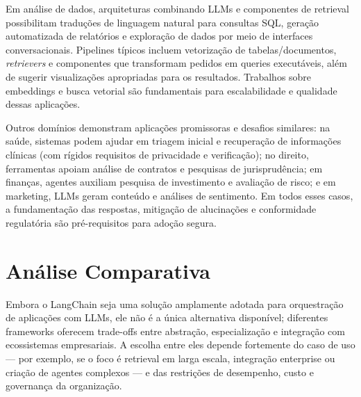 \documentclass[12pt]{article}
\begin{document}
Em análise de dados, arquiteturas combinando LLMs e componentes de retrieval possibilitam traduções de linguagem natural para consultas SQL, geração automatizada de relatórios e exploração de dados por meio de interfaces conversacionais. Pipelines típicos incluem vetorização de tabelas/documentos, \textit{retrievers} e componentes que transformam pedidos em queries executáveis, além de sugerir visualizações apropriadas para os resultados. Trabalhos sobre embeddings e busca vetorial são fundamentais para escalabilidade e qualidade dessas aplicações. \cite{reimers2019sentence, johnson2019billion}


Outros domínios demonstram aplicações promissoras e desafios similares: na saúde, sistemas podem ajudar em triagem inicial e recuperação de informações clínicas (com rígidos requisitos de privacidade e verificação); no direito, ferramentas apoiam análise de contratos e pesquisas de jurisprudência; em finanças, agentes auxiliam pesquisa de investimento e avaliação de risco; e em marketing, LLMs geram conteúdo e análises de sentimento. Em todos esses casos, a fundamentação das respostas, mitigação de alucinações e conformidade regulatória são pré-requisitos para adoção segura. \cite{ji2023survey, zhao2023survey}

\section{Análise Comparativa}
\label{sec:comparacao}

Embora o LangChain seja uma solução amplamente adotada para orquestração de aplicações com LLMs, ele não é a única alternativa disponível; diferentes frameworks oferecem trade-offs entre abstração, especialização e integração com ecossistemas empresariais. A escolha entre eles depende fortemente do caso de uso — por exemplo, se o foco é retrieval em larga escala, integração enterprise ou criação de agentes complexos — e das restrições de desempenho, custo e governança da organização. \cite{langchain2023docs, langchain2023github}
\end{document}
